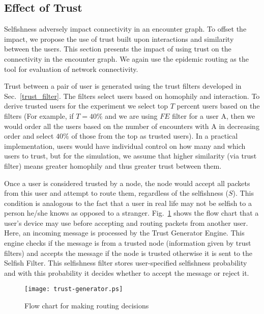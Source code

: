 \documentclass[10pt,conference]{IEEEtran}
\begin{document}
\subsection{Effect of Trust}


Selfishness adversely impact connectivity in an encounter graph. To offset the impact, we propose the use of trust built upon interactions and similarity between the users. This section presents the impact of using trust on the connectivity in the encounter graph. We again use the epidemic routing as the tool for evaluation of network connectivity. 

Trust between a pair of user is generated using the trust filters developed in Sec.~\ref{trust_filter}. The filters select users based on homophily and interaction. To derive trusted users for the experiment we select top $T$ percent users based on the filters (For example, if $T=40\%$ and we are using $FE$ filter for a user A, then we would order all the users based on the number of encounters with A in decreasing order and select $40\%$ of those from the top as trusted users). In a practical implementation, users would have individual control on how many and which users to trust, but for the simulation, we assume that higher similarity (via trust filter) means greater homophily and thus greater trust between them. 


Once a user is considered trusted by a node, the node would accept all packets from this user and  attempt to route them, regardless of the selfishness ($S$). This condition is analogous to the fact that a user in real life may not be selfish to a person he/she knows as opposed to a stranger. Fig.~\ref{fig:trust-gen} shows the flow chart that a user's device may use before accepting and routing packets from another user. Here, an incoming message is processed by the Trust Generator Engine. This engine checks if the message is from a trusted node (information given by trust filters) and accepts the message if the node is trusted otherwise it is sent to the Selfish Filter. This selfishness filter stores user-specified selfishness probability and with this probability it decides whether to accept the message or reject it. 


\begin{figure}
\centering

\texttt{[image: trust-generator.ps]} 

\caption{Flow chart for making routing decisions}

\label{fig:trust-gen}
\end{figure}
\end{document}

